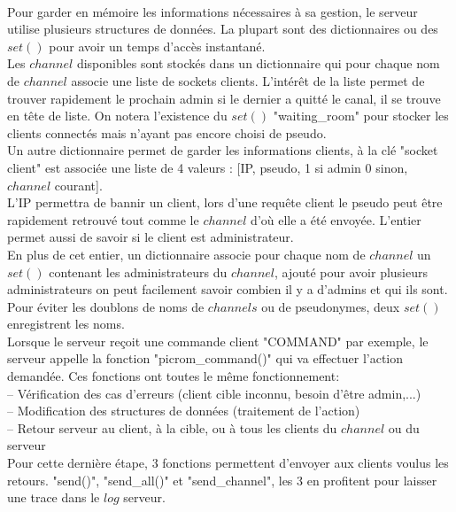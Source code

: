 \documentclass[12pt]{article}
\begin{document}
\\Pour garder en mémoire les informations nécessaires à sa gestion, le serveur utilise plusieurs
structures de données. La plupart sont des dictionnaires ou des $set()$ pour avoir un temps
d'accès instantané.
\\Les $channel$ disponibles sont stockés dans un dictionnaire qui pour chaque nom de $channel$
associe une liste de sockets clients. L'intérêt de la liste permet de trouver rapidement
le prochain admin si le dernier a quitté le canal, il se trouve en tête de liste.
On notera l'existence du $set()$ "waiting\_room" pour stocker les clients connectés mais n'ayant pas
encore choisi de pseudo.
\\Un autre dictionnaire permet de garder les informations clients, à la clé "socket client"
est associée une liste de 4 valeurs : [IP, pseudo, 1 si admin 0 sinon, $channel$ courant].
\\L'IP permettra de bannir un client, lors d'une requête client le pseudo peut être rapidement retrouvé tout comme le 
$channel$ d'où elle a été envoyée. L'entier permet aussi de savoir si le client est administrateur.
\\En plus de cet entier, un dictionnaire associe pour chaque nom de $channel$ un $set()$
contenant les administrateurs du $channel$, ajouté pour avoir plusieurs administrateurs on
peut facilement savoir combien il y a d'admins et qui ils sont.
\\Pour éviter les doublons de noms de $channels$ ou de pseudonymes, deux $set()$ enregistrent
les noms.
\\

Lorsque le serveur reçoit une commande client "COMMAND" par exemple, le serveur appelle
la fonction "picrom\_command()" qui va effectuer l'action demandée. Ces fonctions ont toutes
le même fonctionnement:
\\-- Vérification des cas d'erreurs (client cible inconnu, besoin d'être admin,...)
\\-- Modification des structures de données (traitement de l'action)
\\-- Retour serveur au client, à la cible, ou à tous les clients du $channel$ ou du serveur
\\Pour cette dernière étape, 3 fonctions permettent d'envoyer aux clients voulus les retours.
"send()",
"send\_all()" et "send\_channel", les 3 en profitent pour laisser une trace dans le $log$ serveur.
\\
\end{document}

